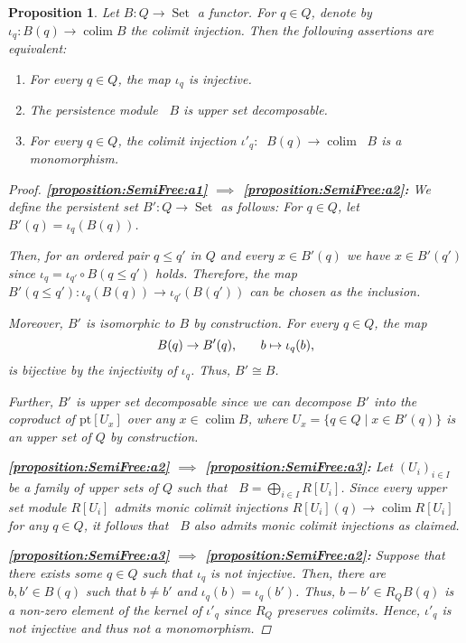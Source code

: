 \documentclass[oneside]{amsart}
\newtheorem{proposition}[theorem]{Proposition}
\theoremstyle{definition}
\DeclareMathOperator\colim{colim}
\newcommand\Set{\operatorname{Set}}
\newcommand\pt{\mathrm{pt}}
\begin{document}
\begin{proposition}%
    \label{proposition:SemiFree}
    Let $B\colon Q \to \Set$ a functor.
    For $q \in Q$, denote by $\iota_q\colon B(q) \to \colim B$ the colimit injection.
    Then the following assertions are equivalent:
    \begin{enumerate}[label=(\roman*)]
        \item\label{proposition:SemiFree:a1} For every $q \in Q$, the map $\iota_q$ is injective.
        \item\label{proposition:SemiFree:a2} The persistence module $\mathop{R_Q} B$ is upper set decomposable.
        \item\label{proposition:SemiFree:a3} For every $q \in Q$, the colimit injection $\iota'_q\colon \mathop{R_Q} B(q) \to \colim \mathop{R_Q} B$ is a monomorphism.
    \end{enumerate}

    \begin{proof}
        \textbf{\ref{proposition:SemiFree:a1} $\implies$ \ref{proposition:SemiFree:a2}:}
        We define the persistent set $B'\colon Q \to \Set$ as follows:
        For $q \in Q$, let $B'(q) = \iota_q(B(q))$.
        
        Then, for an ordered pair $q \leq q'$ in $Q$ and every $x \in B'(q)$ we have $x \in B'(q')$ since $\iota_q = \iota_{q'} \circ B(q \leq q')$ holds.
        Therefore, the map $B'(q \leq q')\colon \iota_q(B(q)) \to \iota_{q'}(B(q'))$ can be chosen as the inclusion.
        
        Moreover, $B'$ is isomorphic to $B$ by construction.
        For every $q \in Q$, the map
        \[ B(q) \to B'(q) \text, \qquad b \mapsto \iota_q(b) \text, \]
        is bijective by the injectivity of $\iota_q$.
        Thus, $B' \cong B$.
    
        Further, $B'$ is upper set decomposable since we can decompose $B'$ into the coproduct of $\pt[U_x]$ over any $x \in \colim B$, where $U_x = \{ q \in Q \mid x \in B'(q) \}$ is an upper set of $Q$ by construction.
    
        \textbf{\ref{proposition:SemiFree:a2} $\implies$ \ref{proposition:SemiFree:a3}:}
        Let $(U_i)_{i \in I}$ be a family of upper sets of $Q$ such that $\mathop{R_Q} B = \bigoplus_{i \in I} R[U_i]$.
        Since every upper set module $R[U_i]$ admits monic colimit injections $R[U_i](q) \to \colim R[U_i]$ for any $q \in Q$, it follows that $\mathop{R_Q} B$ also admits monic colimit injections as claimed.
    
        \textbf{\ref{proposition:SemiFree:a3} $\implies$ \ref{proposition:SemiFree:a2}:}
        Suppose that there exists some $q \in Q$ such that $\iota_q$ is not injective.
        Then, there are $b, b' \in B(q)$ such that $b \neq b'$ and $\iota_q(b) = \iota_q(b')$.
        Thus, $b - b' \in R_Q B(q)$ is a non-zero element of the kernel of $\iota'_q$ since $R_Q$ preserves colimits.
        Hence, $\iota'_q$ is not injective and thus not a monomorphism.
    \end{proof}    
\end{proposition}
\end{document}
